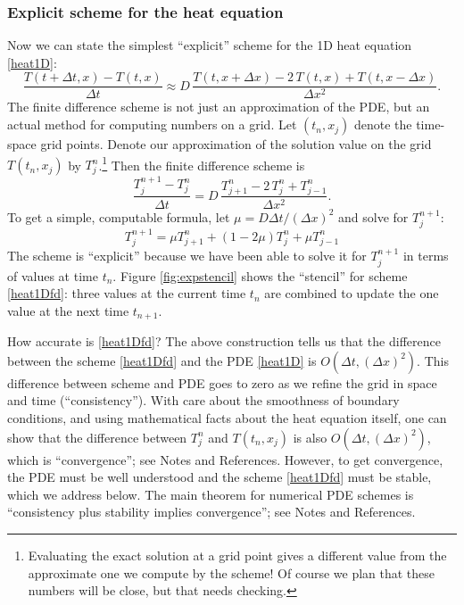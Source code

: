 \documentclass[titlepage,a4paper,final,12pt]{scrartcl}
\begin{document}
\subsubsection*{Explicit scheme for the heat equation}  Now we can state the simplest ``explicit'' scheme for the 1D heat equation \eqref{heat1D}:
	$$\frac{T(t+\Delta t,x) - T(t,x)}{\Delta t} \approx D\,\frac{T(t,x+\Delta x) - 2\, T(t,x) + T(t,x-\Delta x)}{\Delta x^2}.$$
The finite difference scheme is not just an approximation of the PDE, but an actual method for computing numbers on a grid.  Let $(t_n,x_j)$ denote the time-space grid points.  Denote our approximation of the solution value on the grid $T(t_n,x_j)$ by $T_j^n$.\footnote{Evaluating the exact solution at a grid point gives a different value from the approximate one we compute by the scheme!  Of course we plan that these numbers will be close, but that needs checking.}  Then the finite difference scheme is
	$$\frac{T_j^{n+1} - T_j^n}{\Delta t} = D\,\frac{T_{j+1}^n - 2\, T_j^n + T_{j-1}^n}{\Delta x^2}.$$
To get a simple, computable formula, let $\mu = D \Delta t / (\Delta x)^2$ and solve for $T_j^{n+1}$:
\begin{equation}
  T_j^{n+1} = \mu T_{j+1}^n + (1 - 2 \mu) T_j^n + \mu T_{j-1}^n \label{heat1Dfd}
\end{equation}
The scheme is ``explicit'' because we have been able to solve it for $T_j^{n+1}$ in terms of values at time $t_n$.  Figure \ref{fig:expstencil} shows the ``stencil'' for scheme \eqref{heat1Dfd}: three values at the current time $t_n$ are combined to update the one value at the next time $t_{n+1}$.

How accurate is \eqref{heat1Dfd}?  The above construction tells us that the difference between the scheme \eqref{heat1Dfd} and the PDE \eqref{heat1D} is $O(\Delta t,(\Delta x)^2)$.  This difference between scheme and PDE goes to zero as we refine the grid in space and time (``consistency'').  With care about the smoothness of boundary conditions, and using mathematical facts about the heat equation itself, one can show that the difference between $T_j^n$ and $T(t_n,x_j)$ is also $O(\Delta t,(\Delta x)^2)$, which is ``convergence''; see Notes and References.  However, to get convergence, the PDE must be well understood and the scheme \eqref{heat1Dfd} must be stable, which we address below.  The main theorem for numerical PDE schemes is ``consistency plus stability implies convergence''; see Notes and References.
\end{document}
